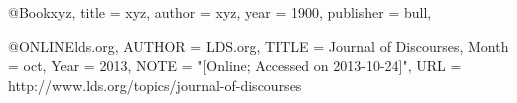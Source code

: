 \clearpage
\def \date {April 14, 2013}








@Book{xyz,
  title = {xyz},
  author = {xyz},
  year = {1900},
  publisher = {bull},
}

@ONLINE{lds.org,
  AUTHOR  = {LDS.org},
  TITLE   = {Journal of Discourses},
  Month = oct,
  Year = {2013},
  NOTE = "[Online; Accessed on 2013-10-24]",
  URL = {http://www.lds.org/topics/journal-of-discourses}
}

